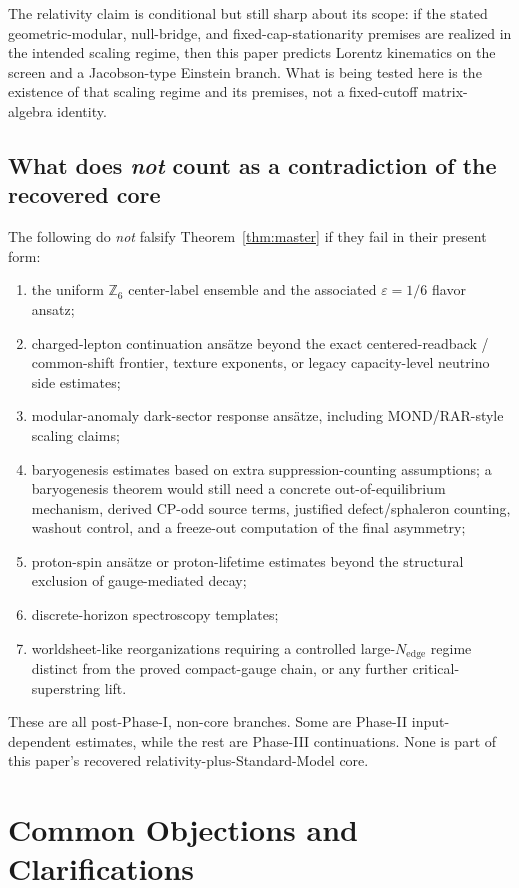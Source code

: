 \documentclass[11pt]{article}
\begin{document}
The relativity claim is conditional but still sharp about its scope: if the stated geometric-modular, null-bridge, and fixed-cap-stationarity premises are realized in the intended scaling regime, then this paper predicts Lorentz kinematics on the screen and a Jacobson-type Einstein branch. What is being tested here is the existence of that scaling regime and its premises, not a fixed-cutoff matrix-algebra identity.

\subsection{What does \emph{not} count as a contradiction of the recovered core}

The following do \emph{not} falsify Theorem~\ref{thm:master} if they fail in their present form:
\begin{enumerate}[leftmargin=2em]
\item the uniform $\mathbb Z_6$ center-label ensemble and the associated $\varepsilon=1/6$ flavor ansatz;
\item charged-lepton continuation ans\"atze beyond the exact centered-readback / common-shift frontier, texture exponents, or legacy capacity-level neutrino side estimates;
\item modular-anomaly dark-sector response ans\"atze, including MOND/RAR-style scaling claims;
\item baryogenesis estimates based on extra suppression-counting assumptions; a baryogenesis theorem would still need a concrete out-of-equilibrium mechanism, derived CP-odd source terms, justified defect/sphaleron counting, washout control, and a freeze-out computation of the final asymmetry;
\item proton-spin ans\"atze or proton-lifetime estimates beyond the structural exclusion of gauge-mediated decay;
\item discrete-horizon spectroscopy templates;
\item worldsheet-like reorganizations requiring a controlled large-$N_{\mathrm{edge}}$ regime distinct from the proved compact-gauge chain, or any further critical-superstring lift.
\end{enumerate}
These are all post-Phase-I, non-core branches. Some are Phase-II input-dependent estimates, while the rest are Phase-III continuations. None is part of this paper's recovered relativity-plus-Standard-Model core.

\section{Common Objections and Clarifications}
\end{document}
